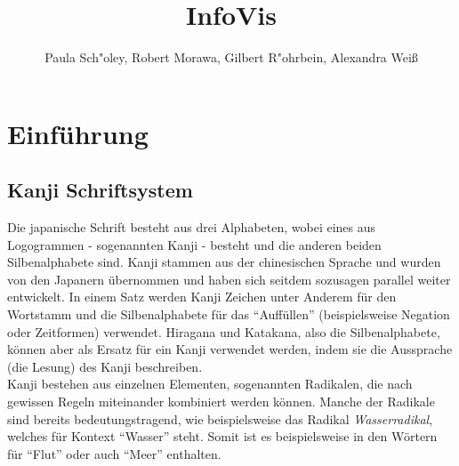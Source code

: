 \documentclass[color,german]{tudbook}
\begin{document}
\author{Paula Sch"oley, Robert Morawa, Gilbert R"ohrbein, Alexandra Wei\ss}
\title{InfoVis}
\fachrichtung{}

\maketitle

\tableofcontents 
\newpage


%



\chapter{Einführung}
\section{Kanji Schriftsystem}
Die japanische Schrift besteht aus drei Alphabeten, wobei eines aus Logogrammen - sogenannten Kanji - besteht und die anderen beiden Silbenalphabete sind. Kanji stammen aus der chinesischen Sprache und wurden von den Japanern übernommen und haben sich seitdem sozusagen parallel weiter entwickelt. In einem Satz werden Kanji Zeichen unter Anderem für den Wortstamm und die Silbenalphabete für das "`Auffüllen"' (beispielsweise Negation oder Zeitformen) verwendet. Hiragana und Katakana, also die Silbenalphabete, können aber als Ersatz für ein Kanji verwendet werden, indem sie die Aussprache (die Lesung) des Kanji beschreiben. \\
Kanji bestehen aus einzelnen Elementen, sogenannten Radikalen, die nach gewissen Regeln miteinander kombiniert werden können. Manche der Radikale sind bereits bedeutungstragend, wie beispielsweise das Radikal \emph{Wasserradikal}, welches für Kontext "`Wasser"' steht. Somit ist es beispielsweise in den Wörtern für "`Flut"' oder auch "`Meer"' enthalten. 
\end{document}
